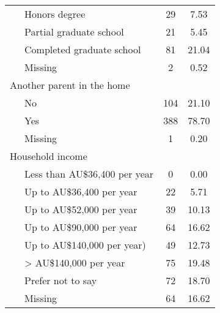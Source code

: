\documentclass[
  english,
  man]{apa6}
\begin{document}
\begin{table}[tbp]
\begin{center}
\begin{threeparttable}
{\begin{tabular}{lcc}
\ \ \ Honors degree & 29 & 7.53\\
\ \ \ Partial graduate school & 21 & 5.45\\
\ \ \ Completed graduate school & 81 & 21.04\\
\ \ \ Missing & 2 & 0.52\\
Another parent in the home &  & \\
\ \ \ No & 104 & 21.10\\
\ \ \ Yes & 388 & 78.70\\
\ \ \ Missing & 1 & 0.20\\
Household income &  & \\
\ \ \ Less than AU\$36,400 per year & 0 & 0.00\\
\ \ \ Up to AU\$36,400 per year & 22 & 5.71\\
\ \ \ Up to AU\$52,000 per year & 39 & 10.13\\
\ \ \ Up to AU\$90,000 per year & 64 & 16.62\\
\ \ \ Up to AU\$140,000 per year) & 49 & 12.73\\
\ \ \ > AU\$140,000 per year & 75 & 19.48\\
\ \ \ Prefer not to say & 72 & 18.70\\
\ \ \ Missing & 64 & 16.62\\
\bottomrule
\end{tabular}

}

\end{threeparttable}
\end{center}

\end{table}
\end{document}
